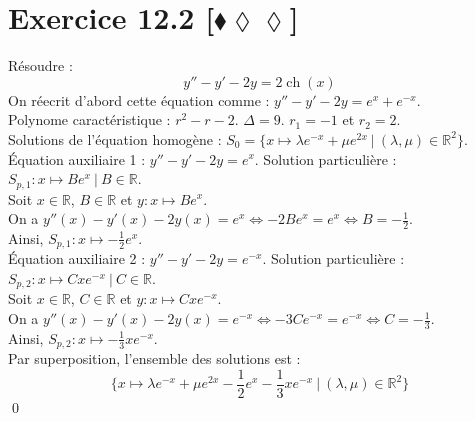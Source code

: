 \documentclass[10pt]{article}
\DeclareMathOperator{\ch}{ch}
\begin{document}
\section*{Exercice 12.2 [$\blacklozenge\lozenge\lozenge$]}
\begin{tcolorbox}[enhanced, width=7in, center, size=fbox, fontupper=\large, drop shadow southwest]
    Résoudre :
    \begin{equation*}
        y'' - y' - 2y = 2\ch(x)
    \end{equation*}
    On réecrit d'abord cette équation comme : $y'' - y' - 2y = e^{x} + e^{-x}$.\\
    Polynome caractéristique : $r^2 - r - 2$. $\Delta = 9$. $r_1 = -1$ et $r_2 = 2$.\\
    Solutions de l'équation homogène : $S_0 = \{x \mapsto \lambda e^{-x} + \mu e^{2x} ~ | ~ (\lambda, \mu) \in \mathbb{R}^2\}$.\\
    Équation auxiliaire 1 : $y'' - y' - 2y = e^x$. Solution particulière : $S_{p,1} : x\mapsto Be^{x} ~ | ~ B\in\mathbb{R}$.\\
    Soit $x\in\mathbb{R}$, $B\in\mathbb{R}$ et $y:x\mapsto Be^x$.\\
    On a $y''(x) - y'(x) - 2y(x) = e^x \iff -2Be^x = e^x \iff B = -\frac{1}{2}$.\\
    Ainsi, $S_{p,1}:x\mapsto -\frac{1}{2}e^x$.\\
    Équation auxiliaire 2 : $y'' - y' - 2y = e^{-x}$. Solution particulière : $S_{p,2} : x\mapsto Cxe^{-x} ~ | ~ C\in\mathbb{R}$.\\
    Soit $x\in\mathbb{R}$, $C\in\mathbb{R}$ et $y:x\mapsto Cxe^{-x}$.\\
    On a $y''(x) - y'(x) - 2y(x) = e^{-x} \iff -3Ce^{-x} = e^{-x} \iff C = -\frac{1}{3}$.\\
    Ainsi, $S_{p,2}: x\mapsto -\frac{1}{3}xe^{-x}$.\\
    Par superposition, l'ensemble des solutions est :
    \begin{equation*}
        \{x\mapsto \lambda e^{-x} + \mu e^{2x} - \frac{1}{2}e^x - \frac{1}{3}xe^{-x} ~ | ~ (\lambda, \mu)\in\mathbb{R}^2\}
    \end{equation*}
    \qed
\end{tcolorbox}
\end{document}
